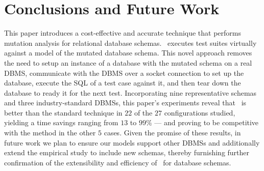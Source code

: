 
\vspace*{-.5em}

\section{Conclusions and Future Work}
\label{sec:conclusions}


This paper introduces a cost-effective and accurate technique that performs mutation analysis for relational database schemas. \Vma~executes test suites virtually against a model of the mutated database schema. This novel approach removes the need to setup an instance of a database with the mutated schema on a real DBMS, communicate with the DBMS over a socket connection to set up the database, execute the SQL \INSERTs of a test case against it, and then tear down the database to ready it for the next test. Incorporating nine representative schemas and three industry-standard DBMSs, this paper's experiments reveal that \vma~is better than the standard technique in $22$ of the $27$ configurations studied, yielding a time savings ranging from $13$ to $99\%$ --- and proving to be competitive with the \Original method in the other $5$ cases.  Given the promise of these results, in future work we plan to ensure our models support other DBMSs and additionally extend the empirical study to include new schemas, thereby furnishing further confirmation of the extensibility and efficiency of \vma~for database schemas.


